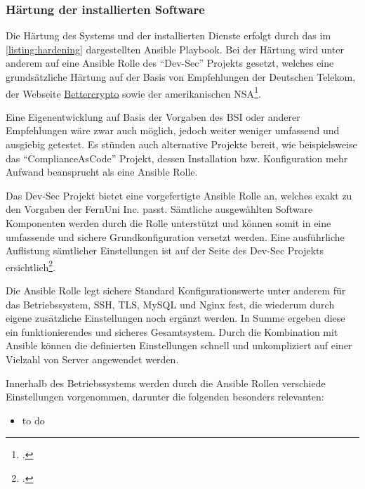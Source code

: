 \subsubsection{Härtung der installierten Software}

Die Härtung des Systems und der installierten Dienste erfolgt durch das im \autoref{listing:hardening} dargestellten Ansible Playbook. Bei der Härtung wird unter anderem auf eine Ansible Rolle des \enquote{Dev-Sec} Projekts gesetzt, welches eine grundsätzliche Härtung auf der Basis von Empfehlungen der Deutschen Telekom, der Webseite \href{https://bettercrypto.org/}{Bettercrypto} sowie der amerikanischen \ac{NSA}\footcite[Vgl.][]{OverviewDevSecBaselines}. 

Eine Eigenentwicklung auf Basis der Vorgaben des \ac{BSI} oder anderer Empfehlungen wäre zwar auch möglich, jedoch weiter weniger umfassend und ausgiebig getestet. Es stünden auch alternative Projekte bereit, wie beispielsweise das \enquote{ComplianceAsCode} Projekt, dessen Installation bzw. Konfiguration mehr Aufwand beansprucht als eine Ansible Rolle.

Das Dev-Sec Projekt bietet eine vorgefertigte Ansible Rolle an, welches exakt zu den Vorgaben der FernUni Inc. passt. Sämtliche ausgewählten Software Komponenten werden durch die Rolle unterstützt und können somit in eine umfassende und sichere Grundkonfiguration versetzt werden. 
Eine ausführliche Auflistung sämtlicher Einstellungen ist auf der Seite des Dev-Sec Projekts ersichtlich\footcite[Vgl.][]{OverviewDevSecBaselines}.

Die Ansible Rolle legt sichere Standard Konfigurationswerte unter anderem für das Betriebssystem, \ac{SSH}, \ac{TLS}, MySQL und Nginx fest, die wiederum durch eigene zusätzliche Einstellungen noch ergänzt werden. In Summe ergeben diese ein funktionierendes und sicheres Gesamtsystem. Durch die Kombination mit Ansible können die definierten Einstellungen schnell und unkompliziert auf einer Vielzahl von Server angewendet werden.

Innerhalb des Betriebssystems werden durch die Ansible Rollen verschiede Einstellungen vorgenommen, darunter die folgenden besonders relevanten:

\begin{itemize}
	\item to do
\end{itemize}

